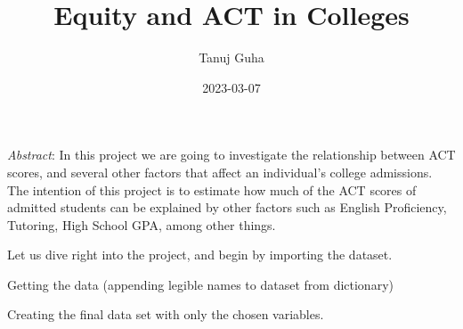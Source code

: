 \documentclass[
]{article}
\title{Equity and ACT in Colleges}
\author{Tanuj Guha}
\date{2023-03-07}
\newenvironment{Shaded}{\begin{snugshade}}{\end{snugshade}}
\newcommand{\AttributeTok}[1]{\textcolor[rgb]{0.77,0.63,0.00}{#1}}
\newcommand{\CommentTok}[1]{\textcolor[rgb]{0.56,0.35,0.01}{\textit{#1}}}
\newcommand{\ConstantTok}[1]{\textcolor[rgb]{0.00,0.00,0.00}{#1}}
\newcommand{\DecValTok}[1]{\textcolor[rgb]{0.00,0.00,0.81}{#1}}
\newcommand{\FunctionTok}[1]{\textcolor[rgb]{0.00,0.00,0.00}{#1}}
\newcommand{\NormalTok}[1]{#1}
\newcommand{\OtherTok}[1]{\textcolor[rgb]{0.56,0.35,0.01}{#1}}
\newcommand{\SpecialCharTok}[1]{\textcolor[rgb]{0.00,0.00,0.00}{#1}}
\newcommand{\StringTok}[1]{\textcolor[rgb]{0.31,0.60,0.02}{#1}}
\begin{document}
\maketitle

\emph{Abstract}: In this project we are going to investigate the
relationship between ACT scores, and several other factors that affect
an individual's college admissions. The intention of this project is to
estimate how much of the ACT scores of admitted students can be
explained by other factors such as English Proficiency, Tutoring, High
School GPA, among other things.

Let us dive right into the project, and begin by importing the dataset.

Getting the data (appending legible names to dataset from dictionary)

\begin{Shaded}
\end{Shaded}

Creating the final data set with only the chosen variables.
\end{document}
